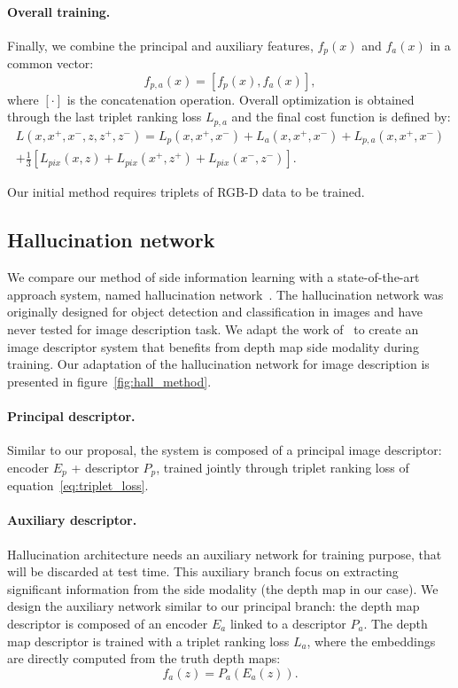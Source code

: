 \paragraph{Overall training.}
Finally, we combine the principal and auxiliary features, $f_p(x)$ and $f_a(x)$ in a common vector:
\begin{equation}
	\label{eq:concat_desc}
	f_{p,a}(x) = \left[ f_p(x), f_a(x)  \right],
\end{equation}
where $[ \cdot ]$ is the concatenation operation. Overall optimization is obtained through the last triplet ranking loss $L_{p,a}$ and the final cost function is defined by:
\begin{multline}
	\label{eq:overall_loss}
	L(x, x^+, x^-,z, z^+, z^-) = L_p(x, x^+, x^-) + L_a(x, x^+, x^-) + L_{p,a}(x, x^+, x^-)\\
	 + \frac{1}{3}\left[ L_{pix}(x, z) + L_{pix}(x^+, z^+) + L_{pix}(x^-, z^-) \right].
\end{multline}

Our initial method requires triplets of RGB-D data to be trained.

\subsection{Hallucination network}


We compare our method of side information learning with a state-of-the-art approach system, named hallucination network~\citep{Hoffman2016}. The hallucination network was originally designed for object detection and classification in images and have never tested for image description task. We adapt the work of~\citet{Hoffman2016} to create an image descriptor system that benefits from depth map side modality during training. Our adaptation of the hallucination network for image description is presented in figure~\ref{fig:hall_method}.

\paragraph{Principal descriptor.}
Similar to our proposal, the system is composed of a principal image descriptor: encoder $E_p$ + descriptor $P_p$, trained jointly through triplet ranking loss of equation~\ref{eq:triplet_loss}.

\paragraph{Auxiliary descriptor.}
Hallucination architecture needs an auxiliary network for training purpose, that will be discarded at test time. This auxiliary branch focus on extracting significant information from the side modality (the depth map in our case). We design the auxiliary network similar to our principal branch: the depth map descriptor is composed of an encoder $E_a$ linked to a descriptor $P_a$. The depth map descriptor is trained with a triplet ranking loss $L_a$, where the embeddings are directly computed from the truth depth maps:
\begin{equation}
	f_a(z) = P_a(E_a(z)).
\end{equation}

